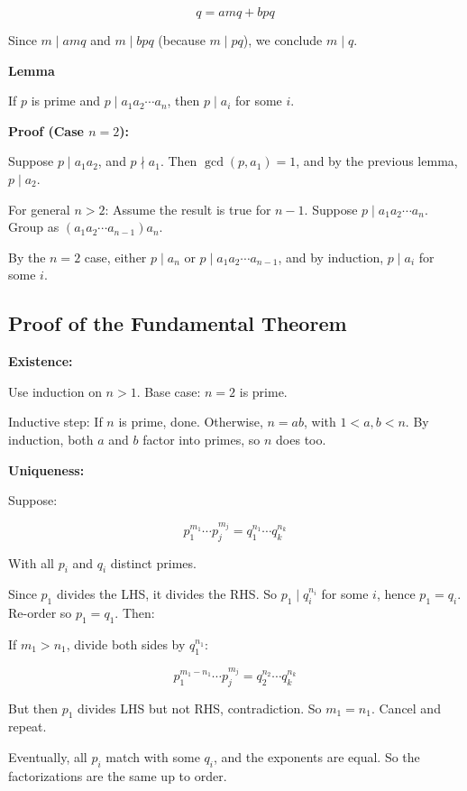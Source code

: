 \[
	q = amq + bpq
\]

Since \(m \mid amq\) and \(m \mid bpq\) (because \(m \mid pq\)), we conclude \(m \mid q\).

\QED

\textbf{Lemma} 

If \(p\) is prime and \(p \mid a_1a_2 \cdots a_n\), then \(p \mid a_i\) for some \(i\).

\textbf{Proof (Case \(n=2\)):} 

Suppose \(p \mid a_1a_2\), and \(p \nmid a_1\).
Then \(\gcd(p, a_1) = 1\), and by the previous lemma, \(p \mid a_2\).

For general \(n > 2\): Assume the result is true for \(n-1\). Suppose \(p \mid a_1a_2 \cdots a_n\).
Group as \((a_1a_2 \cdots a_{n-1})a_n\).

By the \(n=2\) case, either \(p \mid a_n\) or \(p \mid a_1a_2 \cdots a_{n-1}\), and by induction, 
\(p \mid a_i\) for some \(i\).

\QED

\subsection{Proof of the Fundamental Theorem}

\textbf{Existence:}

Use induction on \(n > 1\). Base case: \(n = 2\) is prime.

Inductive step: If \(n\) is prime, done. Otherwise, \(n = ab\), with \(1 < a, b < n\).
By induction, both \(a\) and \(b\) factor into primes, so \(n\) does too.

\textbf{Uniqueness:}

Suppose:

\[
	p_1^{m_1} \cdots p_j^{m_j} = q_1^{n_1} \cdots q_k^{n_k}
\]

With all \(p_i\) and \(q_i\) distinct primes.

Since \(p_1\) divides the LHS, it divides the RHS. So \(p_1 \mid q_i^{n_i}\) for some \(i\), hence 
\(p_1 = q_i\). Re-order so \(p_1 = q_1\). Then:

If \(m_1 > n_1\), divide both sides by \(q_1^{n_1}\):

\[
	p_1^{m_1-n_1} \cdots p_j^{m_j} = q_2^{n_2} \cdots q_k^{n_k}
\]

But then \(p_1\) divides LHS but not RHS, contradiction. So \(m_1 = n_1\). Cancel and repeat.

Eventually, all \(p_i\) match with some \(q_i\), and the exponents are equal. So the factorizations 
are the same up to order.

